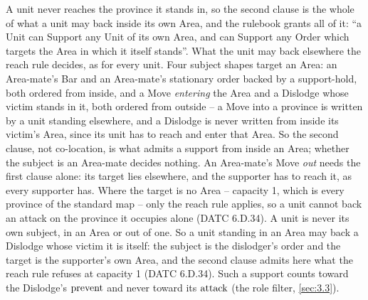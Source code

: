 \documentclass[12pt,a4paper]{article}
\begin{document}
A unit never reaches the province it stands in, so the second clause is the whole of what a unit may back inside its own Area, and the rulebook grants all of it: ``a Unit can Support any Unit of its own Area, and can Support any Order which targets the Area in which it itself stands''.
What the unit may back elsewhere the reach rule decides, as for every unit.
Four subject shapes target an Area: an Area-mate's Bar and an Area-mate's stationary order backed by a support-hold, both ordered from inside, and a Move \emph{entering} the Area and a Dislodge whose victim stands in it, both ordered from outside -- a Move into a province is written by a unit standing elsewhere, and a Dislodge is never written from inside its victim's Area, since its unit has to reach and enter that Area.
So the second clause, not co-location, is what admits a support from inside an Area; whether the subject is an Area-mate decides nothing.
An Area-mate's Move \emph{out} needs the first clause alone: its target lies elsewhere, and the supporter has to reach it, as every supporter has.
Where the target is no Area -- capacity 1, which is every province of the standard map -- only the reach rule applies, so a unit cannot back an attack on the province it occupies alone (DATC 6.D.34).
A unit is never its own subject, in an Area or out of one.
So a unit standing in an Area may back a Dislodge whose victim it is itself: the subject is the dislodger's order and the target is the supporter's own Area, and the second clause admits here what the reach rule refuses at capacity 1 (DATC 6.D.34).
Such a support counts toward the Dislodge's $\operatorname{prevent}$ and never toward its $\operatorname{attack}$ (the role filter, \cref{sec:3.3}).
\end{document}
